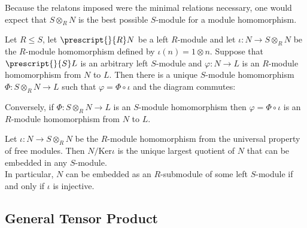 \documentclass{memoir}
\begin{document}
Because the relatons imposed were the minimal relations necessary, one would expect that \(S \otimes_R N\) is the best possible \(S\)-module for a module homomorphism.

\begin{thm}
	Let \(R\leq S\), let \(\prescript{}{R}N\) be a left \(R\)-module and let \(\iota: N \to S \otimes_R N\) be the \(R\)-module homomorphism defined by \(\iota(n) = 1 \otimes n\). Suppose that \(\prescript{}{S}L\) is an arbitrary left \(S\)-module and \(\varphi :N \to L\) is an \(R\)-module homomorphism from \(N\) to \(L\). Then there is a unique \(S\)-module homomorphism \(\Phi :S \otimes_R N \to L\) such that \(\varphi = \Phi \circ \iota \) and the diagram commutes:
\begin{center}
\end{center}
Conversely, if \(\Phi :S \otimes_R N \to L\) is an \(S\)-module homomorphism then \(\varphi  = \Phi \circ \iota\) is an \(R\)-module homomorphism from \(N\) to \(L\).
\end{thm}

\begin{cor}
	Let \(\iota:N \to S \otimes_R N\) be the \(R\)-module homomorphism from the universal property of free modules. Then \(N / \textrm{Ker}\iota\) is the unique largest quotient of \(N\) that can be embedded in any \(S\)-module.\\

	In particular, \(N\) can be embedded as an \(R\)-submodule of some left \(S\)-module if and only if \(\iota\) is injective.
\end{cor}

\begin{exmp}
	
\end{exmp}


\subsection{General Tensor Product}
\label{sub:general_tensor_product}
\end{document}
